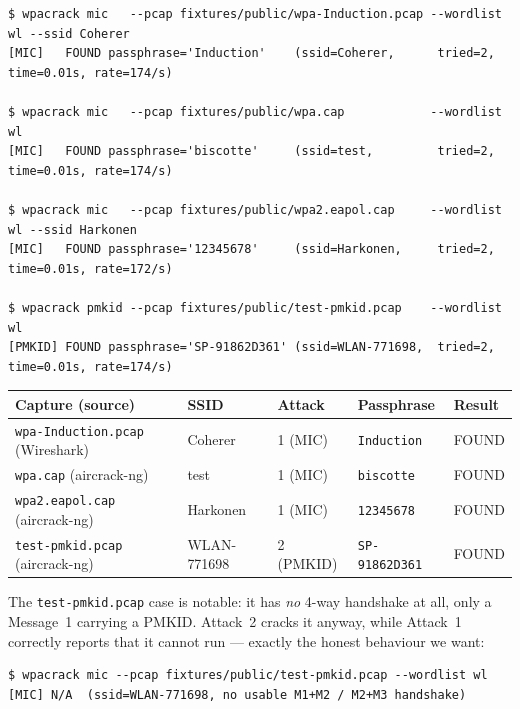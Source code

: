\documentclass[11pt,a4paper]{article}
\newcommand{\code}[1]{\texttt{#1}}
\begin{document}
\begin{verbatim}
$ wpacrack mic   --pcap fixtures/public/wpa-Induction.pcap --wordlist wl --ssid Coherer
[MIC]   FOUND passphrase='Induction'    (ssid=Coherer,      tried=2, time=0.01s, rate=174/s)

$ wpacrack mic   --pcap fixtures/public/wpa.cap            --wordlist wl
[MIC]   FOUND passphrase='biscotte'     (ssid=test,         tried=2, time=0.01s, rate=174/s)

$ wpacrack mic   --pcap fixtures/public/wpa2.eapol.cap     --wordlist wl --ssid Harkonen
[MIC]   FOUND passphrase='12345678'     (ssid=Harkonen,     tried=2, time=0.01s, rate=172/s)

$ wpacrack pmkid --pcap fixtures/public/test-pmkid.pcap    --wordlist wl
[PMKID] FOUND passphrase='SP-91862D361' (ssid=WLAN-771698,  tried=2, time=0.01s, rate=174/s)
\end{verbatim}

\begin{center}
\begin{tabularx}{\textwidth}{@{}X l l l l@{}}
\toprule
\textbf{Capture (source)} & \textbf{SSID} & \textbf{Attack} & \textbf{Passphrase} & \textbf{Result} \\
\midrule
\code{wpa-Induction.pcap} (Wireshark) & Coherer & 1 (MIC)   & \code{Induction}    & \textcolor{good}{FOUND} \\
\code{wpa.cap} (aircrack-ng)          & test    & 1 (MIC)   & \code{biscotte}     & \textcolor{good}{FOUND} \\
\code{wpa2.eapol.cap} (aircrack-ng)   & Harkonen& 1 (MIC)   & \code{12345678}     & \textcolor{good}{FOUND} \\
\code{test-pmkid.pcap} (aircrack-ng)  & WLAN-771698 & 2 (PMKID) & \code{SP-91862D361} & \textcolor{good}{FOUND} \\
\bottomrule
\end{tabularx}
\end{center}

\noindent The \code{test-pmkid.pcap} case is notable: it has \emph{no} 4-way handshake at all,
only a Message~1 carrying a PMKID. Attack~2 cracks it anyway, while Attack~1 correctly reports
that it cannot run --- exactly the honest behaviour we want:

\begin{verbatim}
$ wpacrack mic --pcap fixtures/public/test-pmkid.pcap --wordlist wl
[MIC] N/A  (ssid=WLAN-771698, no usable M1+M2 / M2+M3 handshake)
\end{verbatim}
\end{document}
